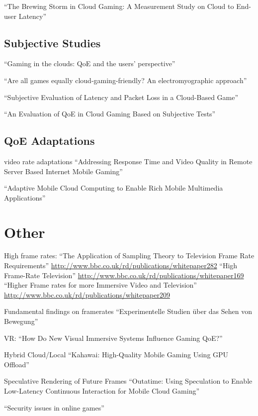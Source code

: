 ``The Brewing Storm in Cloud Gaming: A Measurement Study on Cloud to End-user Latency'' \cite{Choy:2012:BSC:2501560.2501563}

\subsection{Subjective Studies}

``Gaming in the clouds: QoE and the users’ perspective'' \cite{Jarschel20132883}

``Are all games equally cloud-gaming-friendly? An electromyographic approach'' \cite{6404025}

``Subjective Evaluation of Latency and Packet Loss in a Cloud-Based Game'' \cite{6614351}

``An Evaluation of {QoE} in Cloud Gaming Based on Subjective Tests'' \cite{5976180}

\subsection{QoE Adaptations}

video rate adaptations
``Addressing Response Time and Video Quality in Remote Server Based Internet Mobile Gaming'' \cite{5506572}

``Adaptive Mobile Cloud Computing to Enable Rich Mobile Multimedia Applications'' \cite{6413270}




\section{Other}


High frame rates:
``The Application of Sampling Theory to Television Frame Rate Requirements''
\url{http://www.bbc.co.uk/rd/publications/whitepaper282}
``High Frame-Rate Television''
\url{http://www.bbc.co.uk/rd/publications/whitepaper169}
``Higher Frame rates for more Immersive Video and Television''
\url{http://www.bbc.co.uk/rd/publications/whitepaper209}


Fundamental findings on framerates
``Experimentelle Studien über das Sehen von Bewegung'' \cite{wertheimer1912experimentelle}

VR:
``How Do New Visual Immersive Systems Influence Gaming QoE?'' \cite{7148110}


Hybrid Cloud/Local
``Kahawai: High-Quality Mobile Gaming Using GPU Offload'' \cite{Cuervo:2015:KHM:2742647.2742657}


Speculative Rendering of Future Frames
``Outatime: Using Speculation to Enable Low-Latency Continuous Interaction for Mobile Cloud Gaming'' \cite{Lee:2015:OUS:2742647.2742656}

``Security issues in online games'' \cite{doi:10.1108/02640470210424455}



